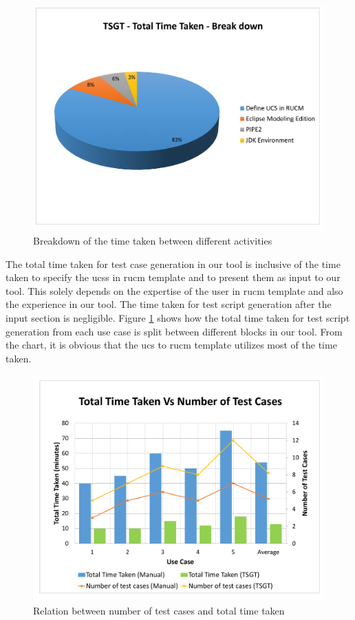 \begin{figure}[htb!]
\centering
\includegraphics[scale=0.45]{content/images/Chapter6/figure4.pdf}
\caption{Breakdown of the time taken between different activities}
\label{fig:chap6fig4}
\end{figure}


The total time taken for test case generation in our tool is inclusive of the time taken to specify the \glspl{ucs} in \gls{rucm} template and to present them as input to our tool. This solely depends on the expertise of the user in \gls{rucm} template and also the experience in our tool. The time taken for test script generation after the input section is negligible. Figure \ref{fig:chap6fig4} shows how the total time taken for test script generation from each use case is split between different blocks in our tool. From the chart, it is obvious that the \gls{ucs} to \gls{rucm} template utilizes most of the time taken.


\begin{figure}[htb!]
\centering
\includegraphics[scale=0.45]{content/images/Chapter6/figure5.pdf}
\caption{Relation between number of test cases and total time taken}
\label{fig:chap6fig5}
\end{figure}

